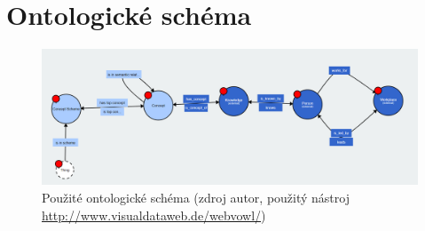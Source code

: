 \chapter{Ontologické schéma}
\begin{figure}
	\includegraphics[width=\linewidth]{img/ontology-scheme.png}
	\caption{Použité ontologické schéma (zdroj autor, použitý nástroj \url{http://www.visualdataweb.de/webvowl/})}
	\label{fig:ontology-scheme}
\end{figure}

